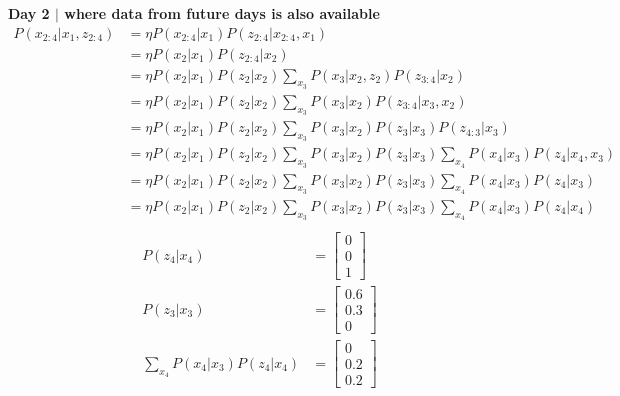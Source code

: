 \documentclass[answers]{exam}
\begin{document}
\begin{questions}
\begin{parts}
\begin{solution}
            \textbf{Day 2 $\mid$ where data from future days is also available}
            \begin{align*}
                P(x_{2:4} | x_1, z_{2:4}) &= \eta P(x_{2:4} | x_1) P(z_{2:4} | x_{2:4}, x_1) \\
                &= \eta P(x_{2} | x_1) P(z_{2:4} | x_2) \\
                &= \eta P(x_{2} | x_1) P(z_{2} | x_2) \sum_{x_3} P(x_3 | x_2, z_2) P(z_{3:4} | x_2) \\
                &= \eta P(x_{2} | x_1) P(z_{2} | x_2) \sum_{x_3} P(x_3 | x_2) P(z_{3:4} | x_3, x_2) \\
                &= \eta P(x_{2} | x_1) P(z_{2} | x_2) \sum_{x_3} P(x_3 | x_2) P(z_3 | x_3) P(z_{4:3} | x_3) \\
                &= \eta P(x_{2} | x_1) P(z_{2} | x_2) \sum_{x_3} P(x_3 | x_2) P(z_3 | x_3) \sum_{x_4} P(x_4 | x_3) P(z_4 | x_4, x_3) \\
                &= \eta P(x_{2} | x_1) P(z_{2} | x_2) \sum_{x_3} P(x_3 | x_2) P(z_3 | x_3) \sum_{x_4} P(x_4 | x_3) P(z_4 | x_3) \\
                &= \eta P(x_{2} | x_1) P(z_{2} | x_2) \sum_{x_3} P(x_3 | x_2) P(z_3 | x_3) \sum_{x_4} P(x_4 | x_3) P(z_4 | x_4) \\ 
            \end{align*}
            \begin{align*}    
                P(z_4 | x_4) &= \begin{bmatrix}
                0 \\
                0 \\
                1
                \end{bmatrix} \\
                P(z_3 | x_3) &= \begin{bmatrix}
                    0.6 \\
                    0.3 \\
                    0
                \end{bmatrix} \\
                \sum_{x_4} P(x_4 | x_3) P(z_4 | x_4) &= \begin{bmatrix} 0 \\ 0.2 \\ 0.2 \end{bmatrix} \\

\end{align*}
\end{solution}
\end{parts}
\end{questions}
\end{document}
